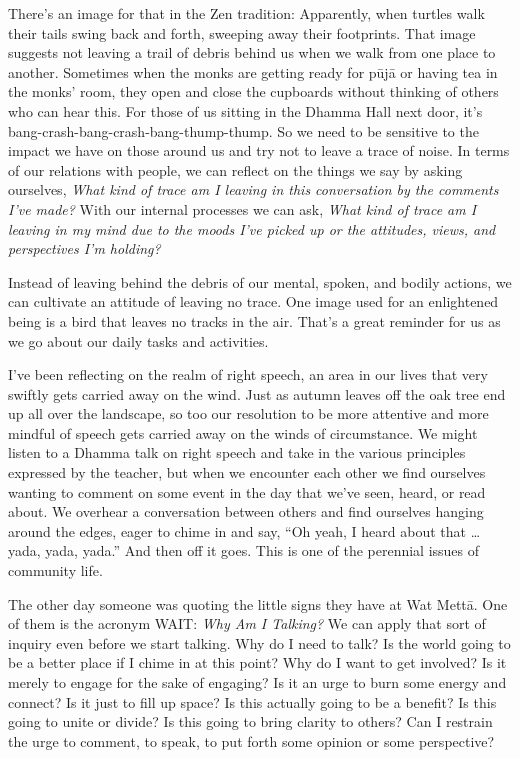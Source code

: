 There's an image for that in the Zen tradition: Apparently, when 
turtles walk their tails swing back and forth, sweeping away their 
footprints. That image suggests not leaving a trail of debris behind us 
when we walk from one place to another. Sometimes when the monks are 
getting ready for pūjā or having tea in the monks' room, they open 
and close the cupboards without thinking of others who can hear this. 
For those of us sitting in the Dhamma Hall next door, it's 
bang-crash-bang-crash-bang-thump-thump. So we need to be sensitive to 
the impact we have on those around us and try not to leave a trace of 
noise. In terms of our relations with people, we can reflect on the 
things we say by asking ourselves, \emph{What kind of trace am I 
leaving in this conversation by the comments I've made?} With our 
internal processes we can ask, \emph{What kind of trace am I leaving in 
my mind due to the moods I've picked up or the attitudes, views, and 
perspectives I'm holding?}

Instead of leaving behind the debris of our mental, spoken, and bodily 
actions, we can cultivate an attitude of leaving no trace. One image 
used for an enlightened being is a bird that leaves no tracks in the 
air. That's a great reminder for us as we go about our daily tasks and 
activities.


I've been reflecting on the realm of right speech, an area in our lives 
that very swiftly gets carried away on the wind. Just as autumn leaves 
off the oak tree end up all over the landscape, so too our resolution 
to be more attentive and more mindful of speech gets carried away on 
the winds of circumstance. We might listen to a Dhamma talk on right 
speech and take in the various principles expressed by the teacher, but 
when we encounter each other we find ourselves wanting to comment on 
some event in the day that we've seen, heard, or read about. We 
overhear a conversation between others and find ourselves hanging 
around the edges, eager to chime in and say, ``Oh yeah, I heard about 
that \ldots{} yada, yada, yada.'' And then off it goes. This is one of 
the perennial issues of community life.

The other day someone was quoting the little signs they have at Wat 
Mettā. One of them is the acronym WAIT: \emph{Why Am I Talking?} We 
can apply that sort of inquiry even before we start talking. Why do I 
need to talk? Is the world going to be a better place if I chime in at 
this point? Why do I want to get involved? Is it merely to engage for 
the sake of engaging? Is it an urge to burn some energy and connect? Is 
it just to fill up space? Is this actually going to be a benefit? Is 
this going to unite or divide? Is this going to bring clarity to 
others? Can I restrain the urge to comment, to speak, to put forth some 
opinion or some perspective?

